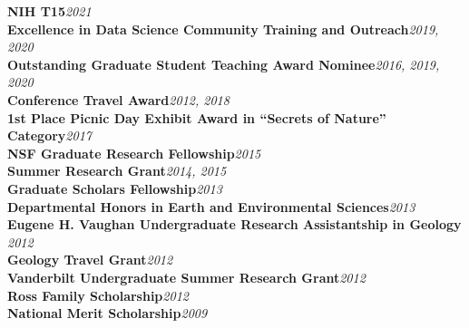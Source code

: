 \documentclass[12pt]{article}
\begin{document}
\textbf{NIH T15}\hfill \emph{2021}\\
\textbf{Excellence in Data Science Community Training and Outreach}\hfill \emph{2019, 2020}\\
\textbf{Outstanding Graduate Student Teaching Award Nominee}\hfill \emph{2016, 2019, 2020}\\
\textbf{Conference Travel Award}\hfill \emph{2012, 2018}\\
\textbf{1st Place Picnic Day Exhibit Award in “Secrets of Nature” Category}\hfill \emph{2017}\\
\textbf{NSF Graduate Research Fellowship}\hfill \emph{2015}\\
\textbf{Summer Research Grant}\hfill \emph{2014, 2015}\\
\textbf{Graduate Scholars Fellowship}\hfill \emph{2013}\\
\textbf{Departmental Honors in Earth and Environmental Sciences}\hfill \emph{2013}\\
\textbf{Eugene H. Vaughan Undergraduate Research Assistantship in Geology }\hfill \emph{2012}\\
\textbf{Geology Travel Grant}\hfill \emph{2012}\\
\textbf{Vanderbilt Undergraduate Summer Research Grant}\hfill \emph{2012}\\
\textbf{Ross Family Scholarship}\hfill \emph{2012}\\
\textbf{National Merit Scholarship}\hfill \emph{2009}\\

%

\end{document}
